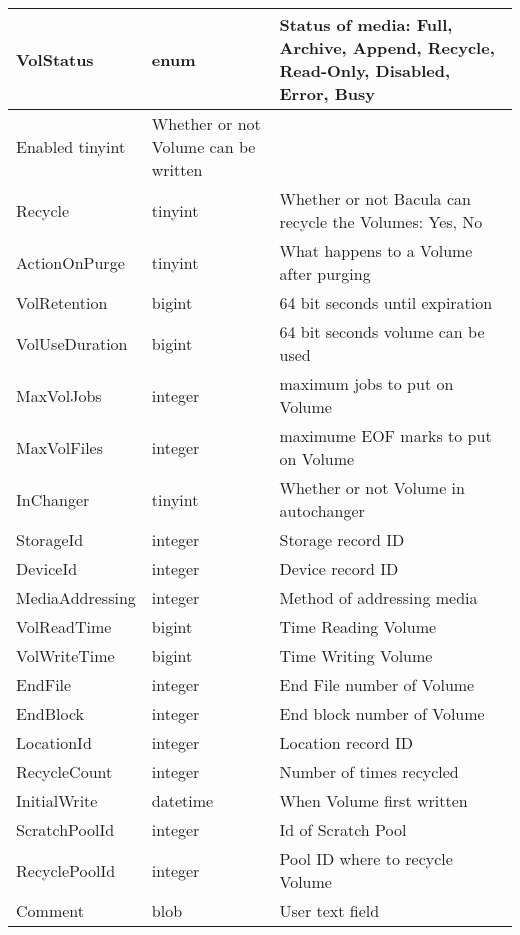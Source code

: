 {{{\begin{longtable}{|l|l|p{2.4in}|}
 \hline
{VolStatus  } & {enum  } & {Status of media: Full, Archive, Append, Recycle,
Read-Only, Disabled, Error, Busy  } \\
 \hline
{Enabled } {tinyint  } & {Whether or not Volume can be written } \\
 \hline
{Recycle  } & {tinyint  } & {Whether or not Bacula can recycle the Volumes:
Yes, No  } \\
 \hline
{ActionOnPurge  } & {tinyint  } & {What happens to a Volume after purging  } \\
 \hline
{VolRetention  } & {bigint  } & {64 bit seconds until expiration  } \\
 \hline
{VolUseDuration  } & {bigint  } & {64 bit seconds volume can be used  } \\
 \hline
{MaxVolJobs  } & {integer  } & {maximum jobs to put on Volume  } \\
 \hline
{MaxVolFiles  } & {integer  } & {maximume EOF marks to put on Volume }
\\ \hline
{InChanger  } & {tinyint  } & {Whether or not Volume in autochanger } \\
 \hline
{StorageId  } & {integer  } & {Storage record ID } \\
 \hline
{DeviceId  } & {integer  } & {Device record ID } \\
 \hline
{MediaAddressing  } & {integer } & {Method of addressing media } \\
 \hline
{VolReadTime  } & {bigint  } & {Time Reading Volume } \\
 \hline
{VolWriteTime  } & {bigint  } & {Time Writing Volume } \\
 \hline
{EndFile  } & {integer  } & {End File number of Volume } \\
 \hline
{EndBlock  } & {integer  } & {End block number of Volume } \\
 \hline
{LocationId  } & {integer  } & {Location record ID } \\
 \hline
{RecycleCount  } & {integer  } & {Number of times recycled } \\
 \hline
{InitialWrite  } & {datetime  } & {When Volume first written } \\
 \hline
{ScratchPoolId  } & {integer  } & {Id of Scratch Pool  } \\
 \hline
{RecyclePoolId  } & {integer  } & {Pool ID where to recycle Volume } \\
 \hline
{Comment  } & {blob  } & {User text field } \\
 \hline


\end{longtable}

}}}
